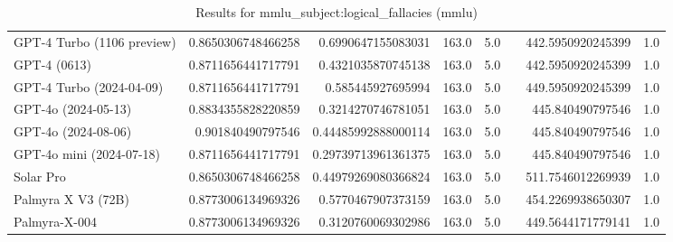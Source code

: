 \begin{table}[htp]
{\begin{tabular}{lrrrrrrr}
GPT-4 Turbo (1106 preview) & 0.8650306748466258 & 0.6990647155083031 & 163.0 & 5.0 &  & 442.5950920245399 & 1.0 \\
GPT-4 (0613) & 0.8711656441717791 & 0.4321035870745138 & 163.0 & 5.0 &  & 442.5950920245399 & 1.0 \\
GPT-4 Turbo (2024-04-09) & 0.8711656441717791 & 0.585445927695994 & 163.0 & 5.0 &  & 449.5950920245399 & 1.0 \\
GPT-4o (2024-05-13) & 0.8834355828220859 & 0.3214270746781051 & 163.0 & 5.0 &  & 445.840490797546 & 1.0 \\
GPT-4o (2024-08-06) & 0.901840490797546 & 0.44485992888000114 & 163.0 & 5.0 &  & 445.840490797546 & 1.0 \\
GPT-4o mini (2024-07-18) & 0.8711656441717791 & 0.29739713961361375 & 163.0 & 5.0 &  & 445.840490797546 & 1.0 \\
Solar Pro & 0.8650306748466258 & 0.44979269080366824 & 163.0 & 5.0 &  & 511.7546012269939 & 1.0 \\
Palmyra X V3 (72B) & 0.8773006134969326 & 0.5770467907373159 & 163.0 & 5.0 &  & 454.2269938650307 & 1.0 \\
Palmyra-X-004 & 0.8773006134969326 & 0.3120760069302986 & 163.0 & 5.0 &  & 449.5644171779141 & 1.0 \\
\bottomrule
\end{tabular}}
\caption{Results for mmlu_subject:logical_fallacies (mmlu)}
\label{fig:mmlu_subject:logical_fallacies (mmlu)}
\end{table}